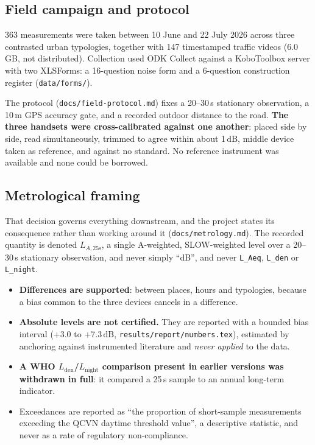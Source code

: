 \documentclass[11pt,a4paper]{article}
\newcommand{\LAt}{$L_{A,25\mathrm{s}}$}
\newcommand{\dB}{\ensuremath{\,\mathrm{dB}}}
\newcommand{\pth}[1]{\texttt{\small #1}}
\begin{document}
\subsection{Field campaign and protocol}

363 measurements were taken between 10 June and 22 July 2026 across three
contrasted urban typologies, together with 147 timestamped traffic
videos (6.0\,GB, not distributed). Collection used ODK Collect against a
KoboToolbox server with two XLSForms: a 16-question noise form and a
6-question construction register (\pth{data/forms/}).

The protocol (\pth{docs/field-protocol.md}) fixes a 20--30\,s stationary
observation, a 10\,m GPS accuracy gate, and a recorded outdoor distance to the
road. \textbf{The three handsets were cross-calibrated against one another}: placed side by side, read simultaneously, trimmed to agree within about 1\dB,
middle device taken as reference, and against no standard. No reference
instrument was available and none could be borrowed.

\subsection{Metrological framing}

That decision governs everything downstream, and the project states its
consequence rather than working around it
(\pth{docs/metrology.md}). The recorded quantity is denoted \LAt{}, a single
A-weighted, SLOW-weighted level over a 20--30\,s stationary observation, and
never simply ``dB'', and never \pth{L\_Aeq}, \pth{L\_den} or \pth{L\_night}.

\begin{itemize}
 \item \textbf{Differences are supported}: between places, hours and typologies,
 because a bias common to the three devices cancels in a difference.
 \item \textbf{Absolute levels are not certified.} They are reported with a
 bounded bias interval (+3.0 to +7.3\dB, \pth{results/report/numbers.tex}),
 estimated by anchoring against instrumented literature and
 \emph{never applied} to the data.
 \item \textbf{A WHO $L_\mathrm{den}$/$L_\mathrm{night}$ comparison present in
 earlier versions was withdrawn in full}: it compared a 25\,s sample to an
 annual long-term indicator.
 \item Exceedances are reported as ``the proportion of short-sample measurements
 exceeding the QCVN daytime threshold value'', a descriptive statistic, and never as a rate of regulatory non-compliance.
\end{itemize}
\end{document}
